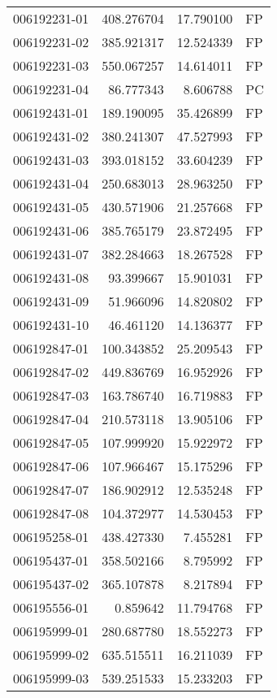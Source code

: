 \begin{tabular}{lrrl}
006192231-01 &  408.276704 &    17.790100 &   FP \\
006192231-02 &  385.921317 &    12.524339 &   FP \\
006192231-03 &  550.067257 &    14.614011 &   FP \\
006192231-04 &   86.777343 &     8.606788 &   PC \\
006192431-01 &  189.190095 &    35.426899 &   FP \\
006192431-02 &  380.241307 &    47.527993 &   FP \\
006192431-03 &  393.018152 &    33.604239 &   FP \\
006192431-04 &  250.683013 &    28.963250 &   FP \\
006192431-05 &  430.571906 &    21.257668 &   FP \\
006192431-06 &  385.765179 &    23.872495 &   FP \\
006192431-07 &  382.284663 &    18.267528 &   FP \\
006192431-08 &   93.399667 &    15.901031 &   FP \\
006192431-09 &   51.966096 &    14.820802 &   FP \\
006192431-10 &   46.461120 &    14.136377 &   FP \\
006192847-01 &  100.343852 &    25.209543 &   FP \\
006192847-02 &  449.836769 &    16.952926 &   FP \\
006192847-03 &  163.786740 &    16.719883 &   FP \\
006192847-04 &  210.573118 &    13.905106 &   FP \\
006192847-05 &  107.999920 &    15.922972 &   FP \\
006192847-06 &  107.966467 &    15.175296 &   FP \\
006192847-07 &  186.902912 &    12.535248 &   FP \\
006192847-08 &  104.372977 &    14.530453 &   FP \\
006195258-01 &  438.427330 &     7.455281 &   FP \\
006195437-01 &  358.502166 &     8.795992 &   FP \\
006195437-02 &  365.107878 &     8.217894 &   FP \\
006195556-01 &    0.859642 &    11.794768 &   FP \\
006195999-01 &  280.687780 &    18.552273 &   FP \\
006195999-02 &  635.515511 &    16.211039 &   FP \\
006195999-03 &  539.251533 &    15.233203 &   FP \\

\end{tabular}
